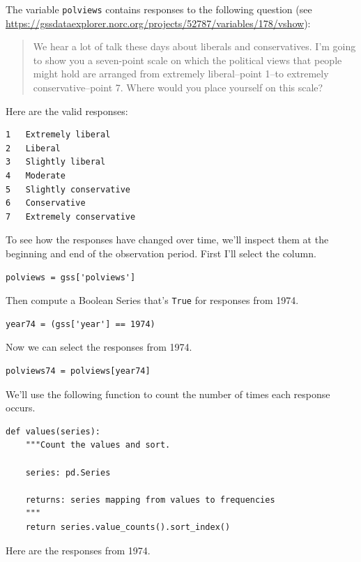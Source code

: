 The variable \passthrough{\lstinline!polviews!} contains responses to
the following question (see
\url{https://gssdataexplorer.norc.org/projects/52787/variables/178/vshow}):

\begin{quote}
We hear a lot of talk these days about liberals and conservatives. I'm
going to show you a seven-point scale on which the political views that
people might hold are arranged from extremely liberal--point 1--to
extremely conservative--point 7. Where would you place yourself on this
scale?
\end{quote}

Here are the valid responses:

\begin{lstlisting}
1   Extremely liberal
2   Liberal
3   Slightly liberal
4   Moderate
5   Slightly conservative
6   Conservative
7   Extremely conservative
\end{lstlisting}

To see how the responses have changed over time, we'll inspect them at
the beginning and end of the observation period. First I'll select the
column.

\begin{lstlisting}[]
polviews = gss['polviews']
\end{lstlisting}

Then compute a Boolean Series that's \passthrough{\lstinline!True!} for
responses from 1974.

\begin{lstlisting}[]
year74 = (gss['year'] == 1974)
\end{lstlisting}

Now we can select the responses from 1974.

\begin{lstlisting}[]
polviews74 = polviews[year74]
\end{lstlisting}

We'll use the following function to count the number of times each
response occurs.

\begin{lstlisting}[]
def values(series):
    """Count the values and sort.
    
    series: pd.Series
    
    returns: series mapping from values to frequencies
    """
    return series.value_counts().sort_index()
\end{lstlisting}

Here are the responses from 1974.


